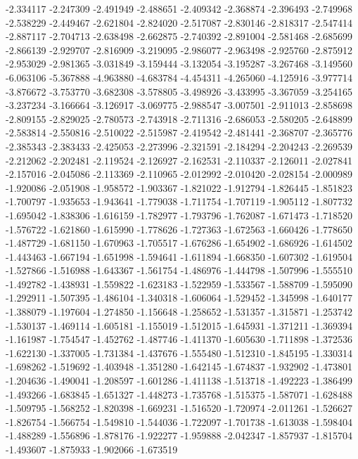 -2.334117
-2.247309
-2.491949
-2.488651
-2.409342
-2.368874
-2.396493
-2.749968
-2.538229
-2.449467
-2.621804
-2.824020
-2.517087
-2.830146
-2.818317
-2.547414
-2.887117
-2.704713
-2.638498
-2.662875
-2.740392
-2.891004
-2.581468
-2.685699
-2.866139
-2.929707
-2.816909
-3.219095
-2.986077
-2.963498
-2.925760
-2.875912
-2.953029
-2.981365
-3.031849
-3.159444
-3.132054
-3.195287
-3.267468
-3.149560
-6.063106
-5.367888
-4.963880
-4.683784
-4.454311
-4.265060
-4.125916
-3.977714
-3.876672
-3.753770
-3.682308
-3.578805
-3.498926
-3.433995
-3.367059
-3.254165
-3.237234
-3.166664
-3.126917
-3.069775
-2.988547
-3.007501
-2.911013
-2.858698
-2.809155
-2.829025
-2.780573
-2.743918
-2.711316
-2.686053
-2.580205
-2.648899
-2.583814
-2.550816
-2.510022
-2.515987
-2.419542
-2.481441
-2.368707
-2.365776
-2.385343
-2.383433
-2.425053
-2.273996
-2.321591
-2.184294
-2.204243
-2.269539
-2.212062
-2.202481
-2.119524
-2.126927
-2.162531
-2.110337
-2.126011
-2.027841
-2.157016
-2.045086
-2.113369
-2.110965
-2.012992
-2.010420
-2.028154
-2.000989
-1.920086
-2.051908
-1.958572
-1.903367
-1.821022
-1.912794
-1.826445
-1.851823
-1.700797
-1.935653
-1.943641
-1.779038
-1.711754
-1.707119
-1.905112
-1.807732
-1.695042
-1.838306
-1.616159
-1.782977
-1.793796
-1.762087
-1.671473
-1.718520
-1.576722
-1.621860
-1.615990
-1.778626
-1.727363
-1.672563
-1.660426
-1.778650
-1.487729
-1.681150
-1.670963
-1.705517
-1.676286
-1.654902
-1.686926
-1.614502
-1.443463
-1.667194
-1.651998
-1.594641
-1.611894
-1.668350
-1.607302
-1.619504
-1.527866
-1.516988
-1.643367
-1.561754
-1.486976
-1.444798
-1.507996
-1.555510
-1.492782
-1.438931
-1.559822
-1.623183
-1.522959
-1.533567
-1.588709
-1.595090
-1.292911
-1.507395
-1.486104
-1.340318
-1.606064
-1.529452
-1.345998
-1.640177
-1.388079
-1.197604
-1.274850
-1.156648
-1.258652
-1.531357
-1.315871
-1.253742
-1.530137
-1.469114
-1.605181
-1.155019
-1.512015
-1.645931
-1.371211
-1.369394
-1.161987
-1.754547
-1.452762
-1.487746
-1.411370
-1.605630
-1.711898
-1.372536
-1.622130
-1.337005
-1.731384
-1.437676
-1.555480
-1.512310
-1.845195
-1.330314
-1.698262
-1.519692
-1.403948
-1.351280
-1.642145
-1.674837
-1.932902
-1.473801
-1.204636
-1.490041
-1.208597
-1.601286
-1.411138
-1.513718
-1.492223
-1.386499
-1.493266
-1.683845
-1.651327
-1.448273
-1.735768
-1.515375
-1.587071
-1.628488
-1.509795
-1.568252
-1.820398
-1.669231
-1.516520
-1.720974
-2.011261
-1.526627
-1.826754
-1.566754
-1.549810
-1.544036
-1.722097
-1.701738
-1.613038
-1.598404
-1.488289
-1.556896
-1.878176
-1.922277
-1.959888
-2.042347
-1.857937
-1.815704
-1.493607
-1.875933
-1.902066
-1.673519
